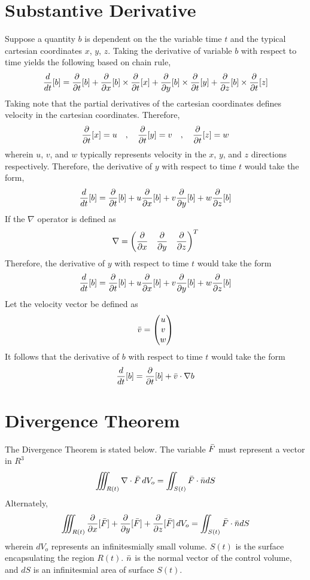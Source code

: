 \documentclass[a4paper, 12pt]{report}
\begin{document}
\begin{center}
\section{Substantive Derivative}
\begin{comment}
Substantive Derivative
Needs Serious revamping
\end{comment}
Suppose a quantity $b$ is dependent on the the variable time $t$ and the typical cartesian coordinates $x$, $y$, $z$. Taking the derivative of variable $b$ with respect to time yields the following based on chain rule,
$$\frac{d}{dt}[b] = \frac{\partial}{\partial t}[b] + \frac{\partial}{\partial x}[b]\times\frac{\partial}{\partial t}[x] + \frac{\partial}{\partial y}[b]\times\frac{\partial}{\partial t}[y] + \frac{\partial}{\partial z}[b]\times\frac{\partial}{\partial t}[z]$$
Taking note that the partial derivatives of the cartesian coordinates defines velocity in the cartesian coordinates. Therefore, 
$$\frac{\partial}{\partial t}[x] = u\quad,\quad \frac{\partial}{\partial t}[y] = v\quad,\quad \frac{\partial}{\partial t}[z] = w$$
wherein $u$, $v$, and $w$ typically represents velocity in the $x$, $y$, and $z$ directions respectively. Therefore, the derivative of $y$ with respect to time $t$ would take the form,
$$\frac{d}{dt}[b] = \frac{\partial}{\partial t}[b] + u\frac{\partial}{\partial x}[b] + v\frac{\partial}{\partial y}[b] + w\frac{\partial}{\partial z}[b]$$
If the $\nabla$ operator is defined as
$$\nabla = \begin{pmatrix} \displaystyle{\frac{\partial}{\partial x}}& \displaystyle{\frac{\partial}{\partial y}}& \displaystyle{\frac{\partial}{\partial z}} \end{pmatrix}^T$$
Therefore, the derivative of $y$ with respect to time $t$ would take the form
$$\frac{d}{dt}[b] = \frac{\partial}{\partial t}[b] + u\frac{\partial}{\partial x}[b] + v\frac{\partial}{\partial y}[b] + w\frac{\partial}{\partial z}[b]$$
Let the velocity vector be defined as 
$$\bar{v} = \begin{pmatrix}u\\v\\w\\ \end{pmatrix}$$
It follows that the derivative of $b$ with respect to time $t$ would take the form
$$\frac{d}{dt}[b] = \frac{\partial}{\partial t}[b] + \bar{v}\cdot\nabla b$$
\section{Divergence Theorem}
\begin{comment}
Divergence Theorem
\end{comment}
The Divergence Theorem is stated below. The variable $\bar{F}$ must represent a vector in $R^3$
$$\iiint_{R(t)}  \nabla \cdot \bar{F} \,dV_o = \iint_{S(t)}\bar{F}\cdot \bar{n}dS$$
Alternately,
$$\iiint_{R(t)}  \frac{\partial}{\partial x}[\bar{F}] + \frac{\partial}{\partial y}[\bar{F}] + \frac{\partial}{\partial z}[\bar{F}] \,dV_o = \iint_{S(t)}\bar{F}\cdot \bar{n}dS$$
wherein $dV_o$ represents an infinitesmially small volume. $S(t)$ is the surface encapsulating the region $R(t)$. $\bar{n}$ is the normal vector of the control volume, and $dS$ is an infinitesmial area of surface $S(t)$.
\end{center}
\end{document}
